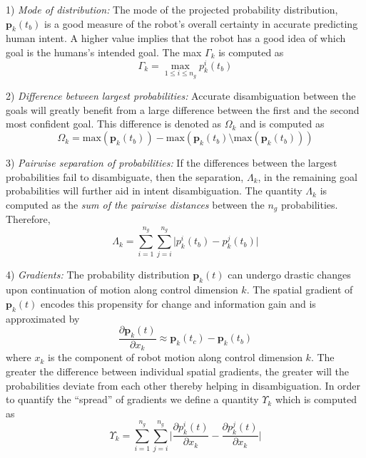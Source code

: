 1) \textit{Mode of distribution:} The mode of the projected probability distribution, $\boldsymbol{p}_k(t_b)$  is a good measure of the robot's overall certainty in accurate predicting human intent. A higher value implies that the robot has a good idea of which goal is the humans's intended goal. The max $\Gamma_k$ is computed as
\begin{equation*}
\Gamma_k = \max\limits_{1 \leq i \leq n_g}p^i_k(t_b)
\end{equation*}

2) \textit{Difference between largest probabilities:} Accurate disambiguation between the goals will greatly benefit from a large difference between the first and the second most confident goal. This difference is denoted as $\Omega_k$ and is computed as
\begin{equation*}
\Omega_k = \text{max}(\boldsymbol{p}_k(t_b)) - \text{max}(\boldsymbol{p}_k(t_b) \setminus \text{max}(\boldsymbol{p}_k(t_b)))
\end{equation*}

3) \textit{Pairwise separation of probabilities:} If the differences between the largest probabilities fail to disambiguate, then the separation, $\Lambda_k$, in the remaining goal probabilities will further aid in intent disambiguation. The quantity $\Lambda_k$ is computed as the \textit{sum of the pairwise distances} between the $n_g$ probabilities. Therefore, 
\begin{equation*}
\Lambda_k = \sum_{i=1}^{n_g}\sum_{j=i}^{n_g}\lvert p^i_k(t_b) - p^j_k(t_b)\rvert
\end{equation*}

4) \textit{Gradients:} The probability distribution $\boldsymbol{p}_k(t)$ can undergo drastic changes upon continuation of motion along control dimension $k$. The spatial gradient of $\boldsymbol{p}_k(t)$ encodes this propensity for change and information gain and is approximated by 
\begin{equation*}
\frac{\partial\boldsymbol{p}_k(t)}{\partial x_k} \approx \boldsymbol{p}_k(t_c) - \boldsymbol{p}_k(t_b)
\end{equation*}
where $x_k$ is the component of robot motion along control dimension $k$. The greater the difference between individual spatial gradients, the greater will the probabilities deviate from each other thereby helping in disambiguation. In order to quantify the ``spread'' of gradients we define a quantity $\Upsilon_k$ which is computed as 
\begin{equation*}
\Upsilon_k = \sum_{i=1}^{n_g}\sum_{j=i}^{n_g}\Big \lvert\frac{\partial p^i_k(t)}{\partial x_k} - \frac{\partial p^j_k(t)}{\partial x_k}\Big \rvert
\end{equation*}

